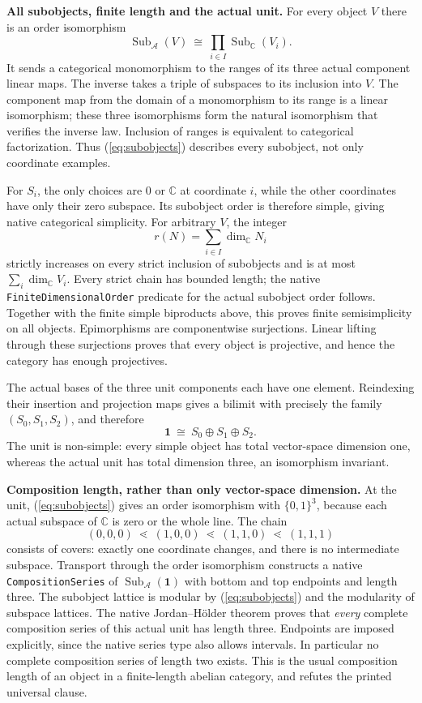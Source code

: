 \documentclass[11pt,a4paper]{article}
\newcommand{\C}{\mathbb C}
\newcommand{\Sub}{\operatorname{Sub}}
\begin{document}
\newpage
\textbf{All subobjects, finite length and the actual unit.}
For every object $V$ there is an order isomorphism
\begin{equation}\label{eq:subobjects}
 \Sub_{\mathcal A}(V)\ \cong\
 \prod_{i\in I}\Sub_{\C}(V_i).
\end{equation}
It sends a categorical monomorphism to the ranges of its three actual component
linear maps. The inverse takes a triple of subspaces to its inclusion into $V$.
The component map from the domain of a monomorphism to its range is a linear
isomorphism; these three isomorphisms form the natural isomorphism that verifies
the inverse law. Inclusion of ranges is equivalent to categorical factorization.
Thus (\ref{eq:subobjects}) describes every subobject, not only coordinate examples.

For $S_i$, the only choices are $0$ or $\C$ at coordinate $i$, while the other
coordinates have only their zero subspace. Its subobject order is therefore
simple, giving native categorical simplicity. For arbitrary $V$, the integer
\[
 r(N)=\sum_{i\in I}\dim_{\C}N_i
\]
strictly increases on every strict inclusion of subobjects and is at most
$\sum_i\dim_{\C}V_i$. Every strict chain has bounded length; the native
\texttt{FiniteDimensionalOrder} predicate for the actual subobject order follows.
Together with the finite simple biproducts above, this proves finite semisimplicity
on all objects. Epimorphisms are componentwise surjections. Linear lifting through
these surjections proves that every object is projective, and hence the category
has enough projectives.

The actual bases of the three unit components each have one element. Reindexing
their insertion and projection maps gives a bilimit with precisely the family
$(S_0,S_1,S_2)$, and therefore
\[
                 \mathbf1\ \cong\ S_0\oplus S_1\oplus S_2.
\]
The unit is non-simple: every simple object has total vector-space dimension one,
whereas the actual unit has total dimension three, an isomorphism invariant.

\textbf{Composition length, rather than only vector-space dimension.}
At the unit, (\ref{eq:subobjects}) gives an order isomorphism with $\{0,1\}^3$,
because each actual subspace of $\C$ is zero or the whole line. The chain
\[
 (0,0,0)\ \lessdot\ (1,0,0)\ \lessdot\ (1,1,0)\ \lessdot\ (1,1,1)
\]
consists of covers: exactly one coordinate changes, and there is no intermediate
subspace. Transport through the order isomorphism constructs a native
\texttt{CompositionSeries} of $\Sub_{\mathcal A}(\mathbf1)$ with bottom and top
endpoints and length three. The subobject lattice is modular by
(\ref{eq:subobjects}) and the modularity of subspace lattices. The native
Jordan--H\"older theorem proves that \emph{every} complete composition series of
this actual unit has length three. Endpoints are imposed explicitly, since the
native series type also allows intervals. In particular no complete composition
series of length two exists. This is the usual composition length of an object
in a finite-length abelian category, and refutes the printed universal clause.
\end{document}
